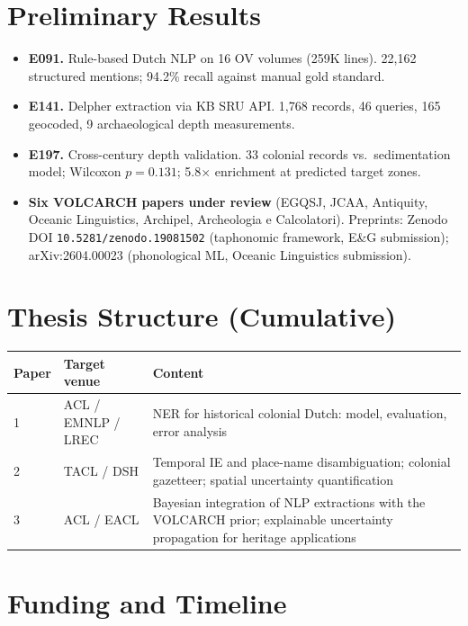 \documentclass[11pt,a4paper]{article}
\begin{document}
\section{Preliminary Results}

\begin{itemize}[nosep]
  \item \textbf{E091.} Rule-based Dutch NLP on 16 OV volumes (259K lines). 22{,}162 structured mentions; 94.2\% recall against manual gold standard.
  \item \textbf{E141.} Delpher extraction via KB SRU API. 1{,}768 records, 46 queries, 165 geocoded, 9 archaeological depth measurements.
  \item \textbf{E197.} Cross-century depth validation. 33 colonial records vs.\ sedimentation model; Wilcoxon $p=0.131$; 5.8$\times$ enrichment at predicted target zones.
  \item \textbf{Six VOLCARCH papers under review} (EGQSJ, JCAA, Antiquity, Oceanic Linguistics, Archipel, Archeologia e Calcolatori). Preprints: Zenodo DOI \texttt{10.5281/zenodo.19081502} (taphonomic framework, E\&G submission); arXiv:2604.00023 (phonological ML, Oceanic Linguistics submission).
\end{itemize}

\section{Thesis Structure (Cumulative)}

\begin{table}[h]
\centering\small
\begin{tabular}{@{}lp{3.2cm}p{8.5cm}@{}}
\toprule
\textbf{Paper} & \textbf{Target venue} & \textbf{Content} \\
\midrule
1 & ACL / EMNLP / LREC & NER for historical colonial Dutch: model, evaluation, error analysis \\
2 & TACL / DSH & Temporal IE and place-name disambiguation; colonial gazetteer; spatial uncertainty quantification \\
3 & ACL / EACL & Bayesian integration of NLP extractions with the VOLCARCH prior; explainable uncertainty propagation for heritage applications \\
\bottomrule
\end{tabular}
\end{table}

\section{Funding and Timeline}
\end{document}
